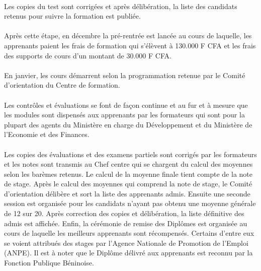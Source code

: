 \paragraph{}
Les copies du test sont corrigées et après délibération, la liste des candidats retenus pour suivre la formation est publiée.
\paragraph{}

Après cette étape, en décembre la pré-rentrée est lancée au cours de laquelle, les apprenants paient les frais de formation qui s'élèvent à 130.000 F CFA et les frais des supports de cours d'un montant de 30.000 F CFA.
\paragraph{}

En janvier, les cours démarrent selon la programmation retenue par le Comité d'orientation du Centre de formation.
\paragraph{}

Les contrôles et évaluations se font de façon continue et au fur et à mesure que les modules sont dispensés aux apprenants par les formateurs qui sont pour la plupart des agents du Ministère en charge du Développement et du Ministère de l'Economie et des Finances.
\paragraph{}

Les copies des évaluations et des examens partiels sont corrigés par les formateurs et les notes sont transmis au Chef centre qui se chargent du calcul des moyennes selon les barèmes retenus. Le calcul de la moyenne finale tient compte de la note de stage. Après le calcul des moyennes qui comprend la note de stage, le Comité d'orientation délibère et sort la liste des apprenants admis. Ensuite une seconde session est organisée pour les candidats n'ayant pas obtenu une moyenne générale de 12 sur 20. Après correction des copies et délibération, la liste définitive des admis est affichée. Enfin, la cérémonie de remise des Diplômes est organisée au cours de laquelle les meilleurs apprenants sont récompensés. Certains d'entre eux se voient attribués des stages par l'Agence Nationale de Promotion de l'Emploi (ANPE). Il est à noter que le Diplôme délivré aux apprenants est reconnu par la Fonction Publique Béninoise. 

